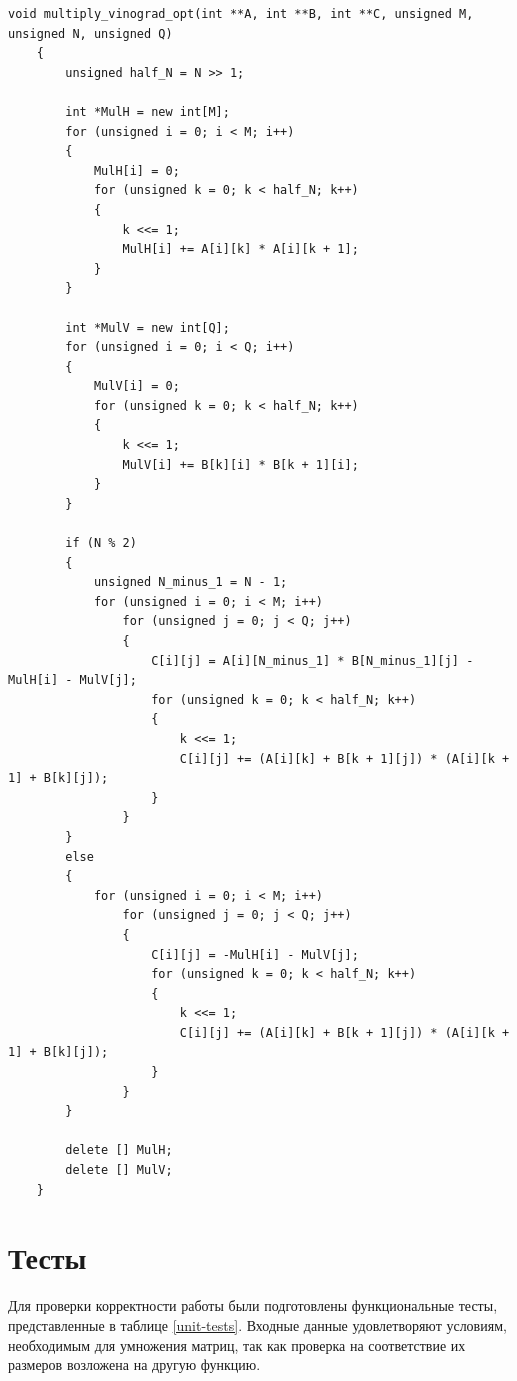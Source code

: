 \documentclass[12pt, a4paper]{report}
\begin{document}
	\begin{lstlisting}[label=code-opt,caption=Оптимизированный алгоритм Винограда]
	void multiply_vinograd_opt(int **A, int **B, int **C, unsigned M, unsigned N, unsigned Q)
	{
		unsigned half_N = N >> 1;
		
		int *MulH = new int[M];
		for (unsigned i = 0; i < M; i++)
		{
			MulH[i] = 0;
			for (unsigned k = 0; k < half_N; k++)
			{
				k <<= 1;
				MulH[i] += A[i][k] * A[i][k + 1];
			}
		}
		
		int *MulV = new int[Q];
		for (unsigned i = 0; i < Q; i++)
		{
			MulV[i] = 0;
			for (unsigned k = 0; k < half_N; k++)
			{
				k <<= 1;
				MulV[i] += B[k][i] * B[k + 1][i];
			}
		}
		
		if (N % 2)
		{
			unsigned N_minus_1 = N - 1;
			for (unsigned i = 0; i < M; i++)
				for (unsigned j = 0; j < Q; j++)
				{
					C[i][j] = A[i][N_minus_1] * B[N_minus_1][j] - MulH[i] - MulV[j];
					for (unsigned k = 0; k < half_N; k++)
					{
						k <<= 1;
						C[i][j] += (A[i][k] + B[k + 1][j]) * (A[i][k + 1] + B[k][j]);
					}
				}
		}
		else
		{
			for (unsigned i = 0; i < M; i++)
				for (unsigned j = 0; j < Q; j++)
				{
					C[i][j] = -MulH[i] - MulV[j];
					for (unsigned k = 0; k < half_N; k++)
					{
						k <<= 1;
						C[i][j] += (A[i][k] + B[k + 1][j]) * (A[i][k + 1] + B[k][j]);
					}
				}
		}
		
		delete [] MulH;
		delete [] MulV;
	}
	\end{lstlisting}

	\newpage

	\section{Тесты}
	Для проверки корректности работы были подготовлены функциональные тесты, представленные в таблице \ref{unit-tests}. Входные данные удовлетворяют условиям, необходимым для умножения матриц, так как проверка на соответствие их размеров возложена на другую функцию.
\end{document}
